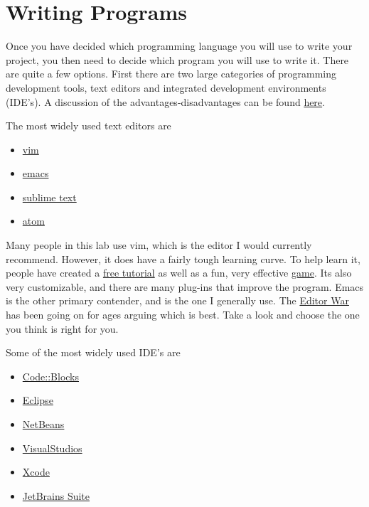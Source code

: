 \documentclass{article}
\begin{document}
\section*{Writing Programs}

Once you have decided which programming language you will use to write your project, you then need to decide which program you will use to write it.
There are quite a few options.
First there are two large categories of programming development tools, text editors and integrated development environments (IDE's).
A discussion of the advantages-disadvantages can be found \href{http://stackoverflow.com/questions/208193/why-should-i-use-an-ide}{here}.

The most widely used text editors are

\begin{itemize}
  \item{\href{https://www.youtube.com/watch?v=_NUO4JEtkDw}{vim}}
  \item{\href{https://www.youtube.com/watch?v=B6jfrrwR10k}{emacs}}
  \item{\href{https://www.sublimetext.com/}{sublime text}}
  \item{\href{https://atom.io/}{atom}}
\end{itemize}

Many people in this lab use vim, which is the editor I would currently recommend. 
However, it does have a fairly tough learning curve.
To help learn it, people have created a \href{http://www.openvim.com/}{free tutorial} as well as a fun, very effective \href{http://vim-adventures.com/}{game}.
Its also very customizable, and there are many plug-ins that improve the program.
Emacs is the other primary contender, and is the one I generally use.
The \href{https://en.wikipedia.org/wiki/Editor_war}{Editor War} has been going on for ages arguing which is best.
Take a look and choose the one you think is right for you.

Some of the most widely used IDE's are

\begin{itemize}
  \item{\href{http://www.codeblocks.org/}{Code::Blocks}}
  \item{\href{https://eclipse.org/downloads/}{Eclipse}}
  \item{\href{https://netbeans.org/}{NetBeans}}
  \item{\href{https://www.visualstudio.com/en-us/visual-studio-homepage-vs.aspx}{VisualStudios}}
  \item{\href{https://developer.apple.com/xcode/}{Xcode}}
  \item{\href{https://www.jetbrains.com/}{JetBrains Suite}}
\end{itemize}
\end{document}
